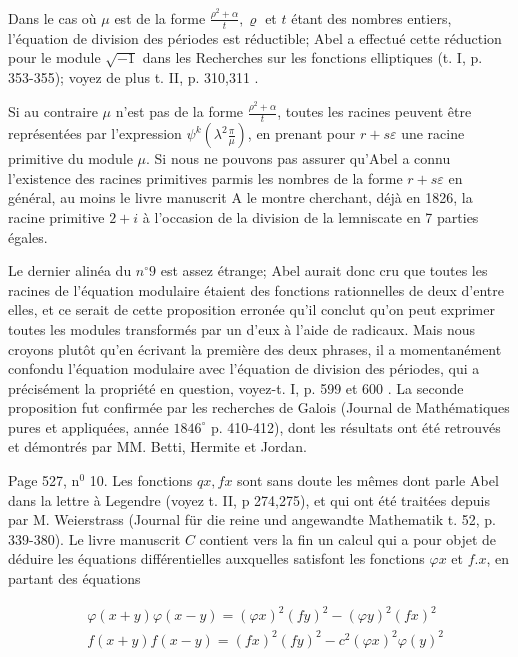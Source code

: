 \documentclass{article}
\begin{document}
Dans le cas où \(\mu\) est de la forme \(\frac{\rho^{2}+\alpha}{t}, \varrho\) et \(t\) étant des nombres entiers, l'équation de division des périodes est réductible; Abel a effectué cette réduction pour le module \(\sqrt{-1}\) dans les Recherches sur les fonctions elliptiques (t. I, p. 353-355); voyez de plus t. II, p. 310,311 .

Si au contraire \(\mu\) n'est pas de la forme \(\frac{\rho^{2}+\alpha}{t}\), toutes les racines peuvent être représentées par l'expression \(\psi^{k}\left(\lambda^{2} \frac{\pi}{\mu}\right)\), en prenant pour \(r+s \varepsilon\) une racine primitive du module \(\mu\). Si nous ne pouvons pas assurer qu'Abel a connu l'existence des racines primitives parmis les nombres de la forme \(r+s \varepsilon\) en général, au moins le livre manuscrit A le montre cherchant, déjà en 1826, la racine primitive \(2+i\) à l'occasion de la division de la lemniscate en 7 parties égales.

Le dernier alinéa du \(n^{\circ} 9\) est assez étrange; Abel aurait donc cru que toutes les racines de l'équation modulaire étaient des fonctions rationnelles de deux d'entre elles, et ce serait de cette proposition erronée qu'il conclut qu'on peut exprimer toutes les modules transformés par un d'eux à l'aide de radicaux. Mais nous croyons plutôt qu'en écrivant la première des deux phrases, il a momentanément confondu l'équation modulaire avec l'équation de division des périodes, qui a précisément la propriété en question, voyez-t. I, p. 599 et 600 . La seconde proposition fut confirmée par les recherches de Galois (Journal de Mathématiques pures et appliquées, année \(1846^{\circ}\) p. 410-412), dont les résultats ont été retrouvés et démontrés par MM. Betti, Hermite et Jordan.

Page 527, \(\mathrm{n}^{0}\) 10. Les fonctions \(q x, f x\) sont sans doute les mêmes dont parle Abel dans la lettre à Legendre (voyez t. II, p 274,275), et qui ont été traitées depuis par M. Weierstrass (Journal für die reine und angewandte Mathematik t. 52, p. 339-380). Le livre manuscrit \(C\) contient vers la fin un calcul qui a pour objet de déduire les équations différentielles auxquelles satisfont les fonctions \(\varphi x\) et \(f . x\), en partant des équations

\[
\begin{aligned}
& \varphi(x+y) \varphi(x-y)=(\varphi x)^{2}(f y)^{2}-(\varphi y)^{2}(f x)^{2} \\
& f(x+y) f(x-y)=(f x)^{2}(f y)^{2}-c^{2}(\varphi x)^{2} \varphi(y)^{2}
\end{aligned}
\]
\end{document}
